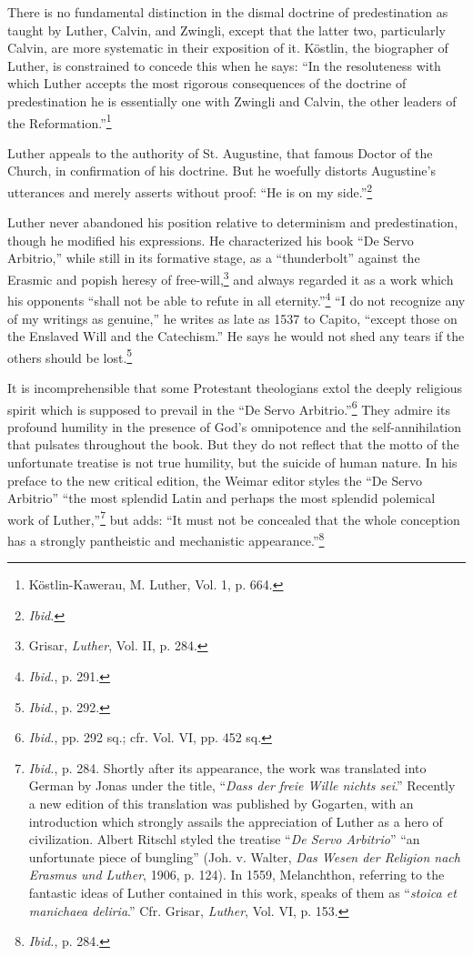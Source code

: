 There is no fundamental distinction in the dismal doctrine of
predestination as taught by Luther, Calvin, and Zwingli, except
that the latter two, particularly Calvin, are more systematic in their
exposition of it. Köstlin, the biographer of Luther, is constrained
to concede this when he says: “In the resoluteness with which Luther
accepts the most rigorous consequences of the doctrine of predestination
he is essentially one with Zwingli and Calvin, the other leaders
of the Reformation.”\footnote{Köstlin-Kawerau, M. Luther, Vol. 1, p. 664.}

Luther appeals to the authority of St. Augustine, that famous
Doctor of the Church, in confirmation of his doctrine. But he
woefully distorts Augustine’s utterances and merely asserts without
proof: “He is on my side.”\footnote{\textit{Ibid.}}

Luther never abandoned his position relative to determinism and
predestination, though he modified his expressions. He characterized
his book “De Servo Arbitrio,” while still in its formative stage, as
a “thunderbolt” against the Erasmic and popish heresy of free-will,\footnote
{Grisar, \textit{Luther}, Vol. II, p. 284.}
and always regarded it as a work which his opponents “shall
not be able to refute in all eternity.”\footnote{\textit{Ibid.}, p. 291.}
“I do not recognize any
of my writings as genuine,'' he writes as late as 1537 to Capito,
``except those on the Enslaved Will and the Catechism.'' He says
he would not shed any tears if the others should be lost.\footnote{\textit{Ibid.}, p. 292.}

It is incomprehensible that some Protestant theologians extol the
deeply religious spirit which is supposed to prevail in the “De Servo
Arbitrio.”\footnote
{\textit{Ibid.}, pp. 292 sq.; cfr. Vol. VI, pp. 452 sq.}
They admire its profound humility in the presence
of God’s omnipotence and the self-annihilation that pulsates
throughout the book. But they do not reflect that the motto of the
unfortunate treatise is not true humility, but the suicide of human
nature. In his preface to the new critical edition, the Weimar editor
styles the “De Servo Arbitrio” “the most splendid Latin and perhaps
the most splendid polemical work of Luther,”\footnote
{\textit{Ibid.}, p. 284. Shortly after its appearance, the work was translated into German by
Jonas under the title, “\textit{Dass der freie Wille nichts sei}.” Recently a new edition of
this translation was published by Gogarten, with an introduction which strongly assails
the appreciation of Luther as a hero of civilization. Albert Ritschl styled the treatise ``\textit{De Servo
Arbitrio}'' “an unfortunate piece of bungling” (Joh. v. Walter, \textit{Das Wesen der Religion
nach Erasmus und Luther}, 1906, p. 124). In 1559, Melanchthon, referring to the fantastic
ideas of Luther contained in this work, speaks of them as “\textit{stoica et manichaea
deliria}.” Cfr. Grisar, \textit{Luther}, Vol. VI, p. 153.}
but adds: “It must
not be concealed that the whole conception has a strongly pantheistic
and mechanistic appearance.”\footnote{\textit{Ibid.}, p. 284.}


